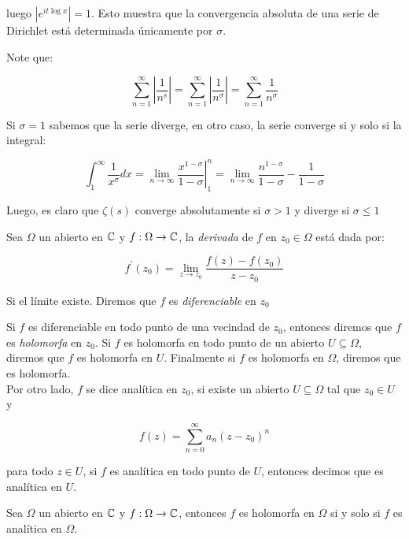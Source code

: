 luego $\left| e^{\displaystyle it\log x}\right|=1$. Esto muestra que la convergencia absoluta de una serie de Dirichlet está determinada únicamente por $\sigma$.

\begin{eg}
Note que:

$$\sum_{n=1}^{\infty} \left|\frac{1}{n^s}\right|=\sum_{n=1}^{\infty} \left|\frac{1}{n^{\sigma}}\right|=\sum_{n=1}^{\infty} \frac{1}{n^{\sigma}}$$

Si $\sigma=1$ sabemos que la serie diverge, en otro caso, la serie converge si y solo si la integral:

$$\int_1^{\infty}\frac{1}{x^\sigma}dx=\lim_{n \to \infty}\left.\dfrac{x^{1-\sigma}}{1-\sigma}\right|_1^{n}=\lim _{n \rightarrow \infty} \frac{n^{1-\sigma}}{1-\sigma}-\frac{1}{1-\sigma}$$

Luego, es claro que $\zeta(s)$ converge absolutamente si $\sigma>1$ y diverge  si $\sigma\leq 1$
\end{eg}

\begin{definition}
Sea $\Omega$ un abierto en $\mathbb{C}$ y $f:\Omega \to \mathbb{C}$, la \textit{derivada} de $f$ en $z_0\in \Omega$ está dada por:

$$f^{\prime}(z_0)=\lim_{z \to z_0} \frac{f(z)-f(z_0)}{z-z_0}$$

Si el límite existe. Diremos que $f$ es \textit{diferenciable} en $z_0$
\end{definition}

Si $f$ es diferenciable en todo punto de una vecindad de $z_0$, entonces diremos que $f$ es \textit{holomorfa} en $z_0$. Si $f$ es holomorfa en todo punto de un abierto $U\subseteq\Omega$, diremos que $f$ es holomorfa en $U$. Finalmente si $f$ es holomorfa en $\Omega$, diremos que es holomorfa.\\

Por otro lado, $f$ se dice analítica en $z_0$, si existe un abierto $U\subseteq \Omega$ tal que $z_0\in U$ y

$$f(z)=\sum_{n=0}^{\infty} a_n (z-z_0)^n$$

para todo $z\in U$, si $f$ es analítica en todo punto de $U$, entonces decimos que es analítica  en $U$.

\begin{theorem}
Sea $\Omega$ un abierto en $\mathbb{C}$ y $f: \Omega \to \mathbb{C}$, entonces $f$ es holomorfa en $\Omega$ si y solo si $f$ es analítica  en $\Omega$.
\end{theorem}

